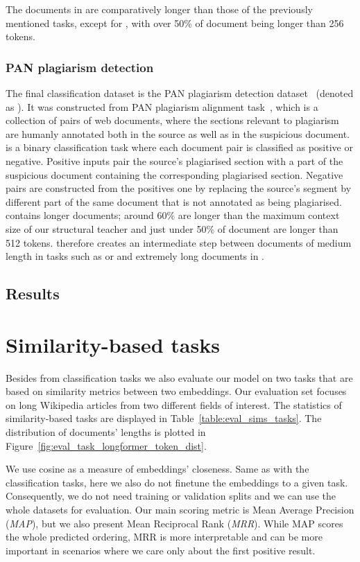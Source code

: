 The documents in  are comparatively longer than those of the
previously mentioned tasks, except for , with over 50\% of document
being longer than 256 tokens.

\subsubsection{PAN plagiarism detection}

The final classification dataset is the PAN plagiarism detection
dataset~\citep{zhou2020multilevel} (denoted as ). It was constructed
from PAN plagiarism alignment task~\citep{potthast2013overview}, which is a
collection of pairs of web documents, where the sections relevant to plagiarism
are humanly annotated both in the source as well as in the suspicious document.
 is a binary classification task where each document pair is
classified as positive or negative. Positive inputs pair the source's
plagiarised section with a part of the suspicious document containing the
corresponding plagiarised section. Negative pairs are constructed from the
positives one by replacing the source's segment by different part of the same
document that is not annotated as being plagiarised.  contains longer
documents; around 60\% are longer than the maximum context size of our
structural teacher and just under 50\% of document are longer than 512 tokens.
 therefore creates an intermediate step between documents of medium
length in tasks such as  or  and extremely long documents
in .

\subsection{Results}

\section{Similarity-based tasks}

Besides from classification tasks we also evaluate our model on two tasks that
are based on similarity metrics between two embeddings. Our evaluation set
focuses on long Wikipedia articles from two different fields of interest. The
statistics of similarity-based tasks are displayed in
Table~\ref{table:eval_sims_tasks}. The distribution of documents' lengths is
plotted in Figure~\ref{fig:eval_task_longformer_token_dist}.

We use cosine as a measure of embeddings' closeness. Same as with the
classification tasks, here we also do not finetune the embeddings to a given
task. Consequently, we do not need training or validation splits and we can use
the whole datasets for evaluation. Our main scoring metric is Mean Average
Precision (\emph{MAP}), but we also present Mean Reciprocal Rank (\emph{MRR}).
While MAP scores the whole predicted ordering, MRR is more interpretable and can
be more important in scenarios where we care only about the first positive
result.

